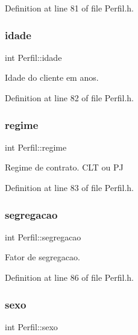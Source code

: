 Definition at line 81 of file Perfil.\+h.

\hypertarget{class_perfil_a310f83d33bf7be6a42b8c91d767e3597}{}\label{class_perfil_a310f83d33bf7be6a42b8c91d767e3597} 
\subsubsection{\texorpdfstring{idade}{idade}}
{\footnotesize\ttfamily int Perfil\+::idade\hspace{0.3cm}{\ttfamily [private]}}

Idade do cliente em anos. 

Definition at line 82 of file Perfil.\+h.

\hypertarget{class_perfil_a4194b50257455f7c9d7c92555344ed47}{}\label{class_perfil_a4194b50257455f7c9d7c92555344ed47} 
\subsubsection{\texorpdfstring{regime}{regime}}
{\footnotesize\ttfamily int Perfil\+::regime\hspace{0.3cm}{\ttfamily [private]}}

Regime de contrato. C\+LT ou PJ 

Definition at line 83 of file Perfil.\+h.

\hypertarget{class_perfil_a007271b5f462827a6ade8af3a9ff0dc5}{}\label{class_perfil_a007271b5f462827a6ade8af3a9ff0dc5} 
\subsubsection{\texorpdfstring{segregacao}{segregacao}}
{\footnotesize\ttfamily int Perfil\+::segregacao\hspace{0.3cm}{\ttfamily [private]}}

Fator de segregacao. 

Definition at line 86 of file Perfil.\+h.

\hypertarget{class_perfil_a811437646338aa346006d4edd7fda9e0}{}\label{class_perfil_a811437646338aa346006d4edd7fda9e0} 
\subsubsection{\texorpdfstring{sexo}{sexo}}
{\footnotesize\ttfamily int Perfil\+::sexo\hspace{0.3cm}{\ttfamily [private]}}

